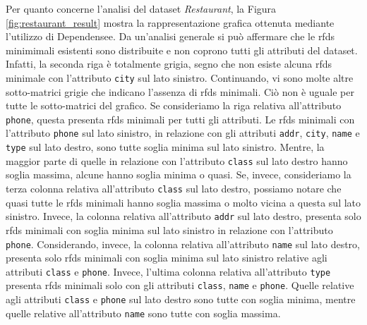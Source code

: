 Per quanto concerne l'analisi del dataset \textit{Restaurant}, la Figura \ref{fig:restaurant_result} mostra la rappresentazione grafica ottenuta mediante l'utilizzo di Dependensee. Da un'analisi generale si pu\`{o} affermare che le \acrlong{rfds} minimimali esistenti sono distribuite e non coprono tutti gli attributi del dataset. Infatti, la seconda riga \`{e} totalmente grigia, segno che non esiste alcuna \acrlong{rfds} minimale con l'attributo \texttt{city} sul lato sinistro. Continuando, vi sono molte altre sotto-matrici grigie che indicano l'assenza di \acrlong{rfds} minimali. Ci\`{o} non \`{e} uguale per tutte le sotto-matrici del grafico. Se consideriamo la riga relativa all'attributo \texttt{phone}, questa presenta \acrlong{rfds} minimali per tutti gli attributi. Le \acrlong{rfds} minimali con l'attributo \texttt{phone} sul lato sinistro, in relazione con gli attributi \texttt{addr}, \texttt{city}, \texttt{name} e \texttt{type} sul lato destro, sono tutte soglia minima sul lato sinistro. Mentre, la maggior parte di quelle in relazione con l'attributo \texttt{class} sul lato destro hanno soglia massima, alcune hanno soglia minima o quasi. Se, invece, consideriamo la terza colonna relativa all'attributo \texttt{class} sul lato destro, possiamo notare che quasi tutte le \acrlong{rfds} minimali hanno soglia massima o molto vicina a questa sul lato sinistro. Invece, la colonna relativa all'attributo \texttt{addr} sul lato destro, presenta solo \acrlong{rfds} minimali con soglia minima sul lato sinistro in relazione con l'attributo \texttt{phone}. Considerando, invece, la colonna relativa all'attributo \texttt{name} sul lato destro, presenta solo \acrlong{rfds} minimali con soglia minima sul lato sinistro relative agli attributi \texttt{class} e \texttt{phone}. Invece, l'ultima colonna relativa all'attributo \texttt{type} presenta \acrlong{rfds} minimali solo con gli attributi \texttt{class}, \texttt{name} e \texttt{phone}. Quelle relative agli attributi \texttt{class} e \texttt{phone} sul lato destro sono tutte con soglia minima, mentre quelle relative all'attributo \texttt{name} sono tutte con soglia massima.\par
